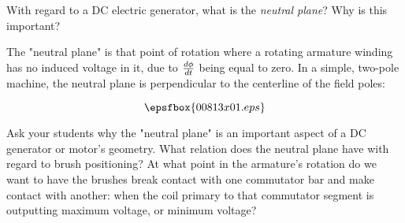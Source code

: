 

With regard to a DC electric generator, what is the {\it neutral plane}?  Why is this important?







The "neutral plane" is that point of rotation where a rotating armature winding has no induced voltage in it, due to $d\phi \over dt$ being equal to zero.  In a simple, two-pole machine, the neutral plane is perpendicular to the centerline of the field poles:

$$\epsfbox{00813x01.eps}$$







Ask your students why the "neutral plane" is an important aspect of a DC generator or motor's geometry.  What relation does the neutral plane have with regard to brush positioning?  At what point in the armature's rotation do we want to have the brushes break contact with one commutator bar and make contact with another: when the coil primary to that commutator segment is outputting maximum voltage, or minimum voltage?




